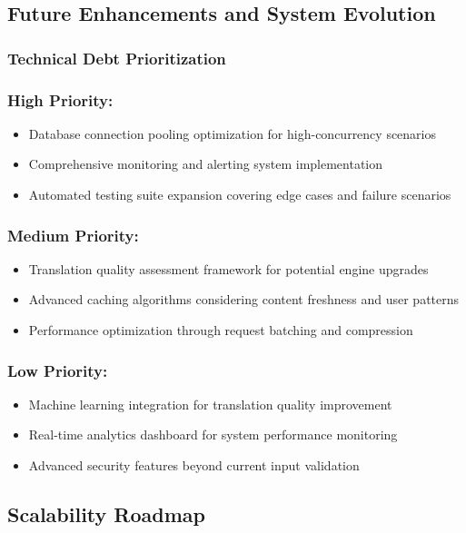 \subsection{Future Enhancements and System Evolution}

\subsubsection{Technical Debt Prioritization}

\subsubsection{High Priority:}
\begin{itemize}
    \item Database connection pooling optimization for high-concurrency scenarios
    \item Comprehensive monitoring and alerting system implementation
    \item Automated testing suite expansion covering edge cases and failure scenarios
\end{itemize}

\subsubsection{Medium Priority:}
\begin{itemize}
    \item Translation quality assessment framework for potential engine upgrades
    \item Advanced caching algorithms considering content freshness and user patterns
    \item Performance optimization through request batching and compression
\end{itemize}

\subsubsection{Low Priority:}
\begin{itemize}
    \item Machine learning integration for translation quality improvement
    \item Real-time analytics dashboard for system performance monitoring
    \item Advanced security features beyond current input validation
\end{itemize}

\subsection{Scalability Roadmap}

